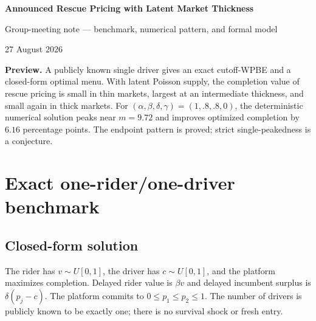 \documentclass[11pt]{article}
\begin{document}
\begin{center}
{\Large\bfseries Announced Rescue Pricing with Latent Market Thickness}\par
\vspace{2pt}
{\normalsize Group-meeting note --- benchmark, numerical pattern, and formal model}\par
\vspace{2pt}
{\small 27 August 2026}
\end{center}
\vspace{-5pt}

\noindent\textbf{Preview.}
A publicly known single driver gives an exact cutoff-WPBE and a closed-form
optimal menu.  With latent Poisson supply, the completion value of rescue
pricing is small in thin markets, largest at an intermediate thickness, and
small again in thick markets.  For
$(\alpha,\beta,\delta,\gamma)=(1,.8,.8,0)$, the deterministic numerical
solution peaks near $m=9.72$ and improves optimized completion by $6.16$
percentage points.  The endpoint pattern is proved; strict single-peakedness
is a conjecture.

\section{Exact one-rider/one-driver benchmark}

\subsection{Closed-form solution}

The rider has $v\sim U[0,1]$, the driver has $c\sim U[0,1]$, and the platform
maximizes completion.  Delayed rider value is $\beta v$ and delayed incumbent
surplus is $\delta(p_j-c)$.  The platform commits to
$0\le p_1\le p_2\le1$.  The number of drivers is publicly known to be exactly
one; there is no survival shock or fresh entry.
\end{document}
